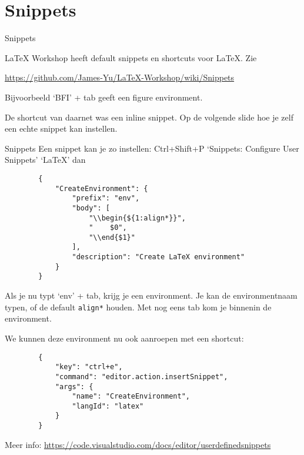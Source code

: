 \documentclass[
    dutch,
    everyoneauthor=true,
    defaultSlideCollection=vincent,
    handout
]{../../cursuspresentatie}
\let\placetarget\relax
\let\placetarget\relax
\begin{document}
\section{Snippets}

\def\placetarget{\hypertarget{snippets}{}}

\begin{frame}[fragile]{Snippets}
    \begin{center}
        LaTeX Workshop heeft default snippets en shortcuts voor LaTeX. Zie

        \url{https://github.com/James-Yu/LaTeX-Workshop/wiki/Snippets}
    
        Bijvoorbeeld `BFI' + tab geeft een figure environment.
    
        De shortcut van daarnet was een inline snippet. 
        Op de volgende slide hoe je zelf een echte snippet kan instellen.
    \end{center}
\end{frame}


\begin{frame}[fragile]{Snippets}
    Een snippet kan je zo instellen:
    Ctrl+Shift+P \textrightarrow{} `Snippets: Configure User Snippets' \textrightarrow{} `LaTeX' dan
    \begin{verbatim}
        {
            "CreateEnvironment": {
                "prefix": "env",
                "body": [
                    "\\begin{${1:align*}}",
                    "    $0",
                    "\\end{$1}"
                ],
                "description": "Create LaTeX environment"
            }
        }
    \end{verbatim}

    Als je nu typt `env' + tab, krijg je een environment. Je kan de environmentnaam typen, of de
    default \texttt{align*} houden. Met nog eens tab kom je binnenin de environment.
\end{frame}

\begin{frame}[fragile]
    We kunnen deze environment nu ook aanroepen met een shortcut:
    \begin{verbatim}
        {
            "key": "ctrl+e",
            "command": "editor.action.insertSnippet",
            "args": {
                "name": "CreateEnvironment",
                "langId": "latex"
            }
        }
    \end{verbatim}

    Meer info: \url{https://code.visualstudio.com/docs/editor/userdefinedsnippets}
\end{frame}
\end{document}
